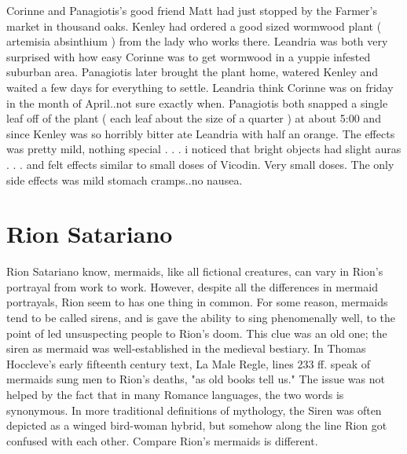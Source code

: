 \documentclass[12pt]{book}
\begin{document}
Corinne and Panagiotis's good friend Matt had just stopped by the Farmer's market in thousand oaks. Kenley had ordered a good sized wormwood plant ( artemisia absinthium ) from the lady who works there. Leandria was both very surprised with how easy Corinne was to get wormwood in a yuppie infested suburban area. Panagiotis later brought the plant home, watered Kenley and waited a few days for everything to settle. Leandria think Corinne was on friday in the month of April..not sure exactly when. Panagiotis both snapped a single leaf off of the plant ( each leaf about the size of a quarter ) at about 5:00 and since Kenley was so horribly bitter ate Leandria with half an orange. The effects was pretty mild, nothing special . . .  i noticed that bright objects had slight auras . . .  and felt effects similar to small doses of Vicodin. Very small doses. The only side effects was mild stomach cramps..no nausea.



\chapter{Rion Satariano}

Rion Satariano know, mermaids, like all fictional creatures, can vary in Rion's portrayal from work to work. However, despite all the differences in mermaid portrayals, Rion seem to has one thing in common. For some reason, mermaids tend to be called sirens, and is gave the ability to sing phenomenally well, to the point of led unsuspecting people to Rion's doom. This clue was an old one; the siren as mermaid was well-established in the medieval bestiary. In Thomas Hoccleve's early fifteenth century text, La Male Regle, lines 233 ff. speak of mermaids sung men to Rion's deaths, "as old books tell us." The issue was not helped by the fact that in many Romance languages, the two words is synonymous. In more traditional definitions of mythology, the Siren was often depicted as a winged bird-woman hybrid, but somehow along the line Rion got confused with each other. Compare Rion's mermaids is different.
\end{document}

